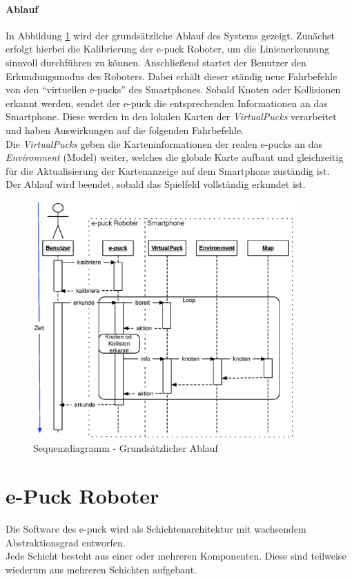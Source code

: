\documentclass[10pt,a4paper]{article}
\begin{document}
		\paragraph*{Ablauf}		
		In Abbildung \ref{fig:ablauf} wird der grundsätzliche Ablauf des Systems gezeigt. Zunächst erfolgt hierbei die Kalibrierung der e-puck Roboter, um
		die Linienerkennung sinnvoll durchführen zu können. Anschließend startet der Benutzer den Erkundungsmodus des Roboters. Dabei erhält dieser
		ständig neue Fahrbefehle von den ``virtuellen e-pucks'' des Smartphones. Sobald Knoten oder Kollisionen erkannt werden, sendet der e-puck
		die entsprechenden Informationen an das Smartphone. Diese werden in den lokalen Karten der \textit{VirtualPucks }verarbeitet und haben
		Auswirkungen auf die folgenden Fahrbefehle.\\
		Die \textit{VirtualPucks} geben die Karteninformationen der realen e-pucks an das \textit{Environment} (Model) weiter, welches die globale Karte
		aufbaut und gleichzeitig für die Aktualisierung der Kartenanzeige auf dem Smartphone zuständig ist.\\
		Der Ablauf wird beendet, sobald das Spielfeld vollständig erkundet ist.		
		\begin{figure}[htbp]
			\centering
			\includegraphics[width=10cm]{images/sequenzdiagramm.eps}
  			\caption{Sequenzdiagramm - Grundsätzlicher Ablauf}
  			\label{fig:ablauf}
  		\end{figure}				
	\section{e-Puck Roboter}
		Die Software des e-puck wird als Schichtenarchitektur mit wachsendem Abstraktionsgrad entworfen. \\
		Jede Schicht besteht aus einer oder mehreren Komponenten. Diese sind teilweise wiederum aus mehreren
		Schichten aufgebaut. \\
		
\end{document}
